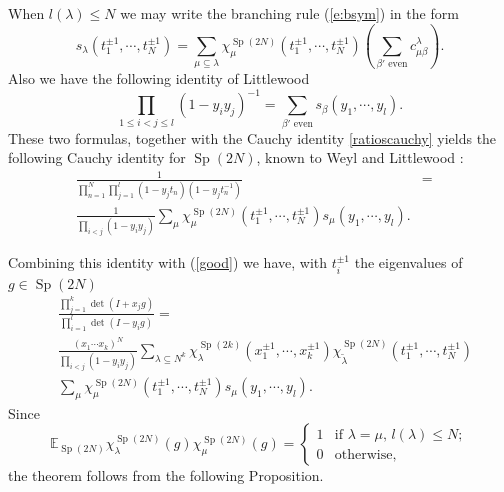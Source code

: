 \documentclass[11pt]{amsart}
\newcommand{\tmop}[1]{\ensuremath{\operatorname{#1}}}
\begin{document}
  When $l ( \lambda ) \leqslant N$ we may write the branching rule
  (\ref{e:bsym}) in the form
  \begin{equation}
    s_{\lambda} ( t_1^{\pm 1}, \cdots, t_N^{\pm 1} ) = \sum_{\mu \subseteq
    \lambda} \chi_{\mu}^{\tmop{Sp} ( 2 N )} ( t_1^{\pm 1}, \cdots, t_N^{\pm 1}
    ) \left( \sum_{\text{$\beta'$ even}} c^{\lambda}_{\mu \beta} \right) .
  \end{equation}
  Also we have the following identity of Littlewood~{\cite{Li}}
  \[ \prod_{1 \leqslant i < j \leqslant l} ( 1 - y_i y_j )^{- 1} =
     \sum_{\text{$\beta'$ even}} s_{\beta} ( y_1, \cdots, y_l ) . \]
  These two formulas, together with the Cauchy identity \eqref{ratioscauchy} yields the
  following Cauchy identity for $\tmop{Sp} ( 2 N )$, known to Weyl
  {\cite{weyl}} and Littlewood {\cite{Li}}:
  \begin{eqnarray*}
    \frac{1}{\prod_{n = 1}^N \prod_{j = 1}^l ( 1 - y_j t_n ) ( 1 - y_j t_n^{-
    1} )} & = & \\
    \frac{1}{\prod_{i < j} ( 1 - y_i y_j )} \sum_{\mu} \chi_{\mu}^{\tmop{Sp} (
    2 N )} ( t_1^{\pm 1}, \cdots, t_N^{\pm 1} ) s_{\mu} ( y_1, \cdots, y_l
    ).
    &  &
  \end{eqnarray*}


  Combining this identity with (\ref{good}) we have, with $t_i^{\pm 1}$
  the eigenvalues of $g \in \tmop{Sp} ( 2 N )$
\begin{equation*}
\begin{aligned}
&    \frac{\prod_{j = 1}^k \det ( I + x_j g )}{\prod_{i = 1}^l
\det ( I - y_i g
    )} =\\
    & \frac{( x_1 \cdots x_k )^N}{\prod_{i < j} ( 1 - y_i y_j )}
\sum_{\lambda
    \subseteq N^k} \chi_{\lambda}^{\tmop{Sp} ( 2
    k
    )} (
    x_1^{\pm 1}, \cdots, x_k^{\pm 1} ) \chi_{\tilde{\lambda}}^{\tmop{Sp} ( 2 N
    )} ( t_1^{\pm 1}, \cdots, t_N^{\pm 1} )  \\
&    \sum_{\mu} \chi_{\mu}^{\tmop{Sp} ( 2 N )} ( t_1^{\pm 1},
\cdots, t_N^{\pm
    1} ) s_{\mu} ( y_1, \cdots, y_l ).
    \end{aligned}
\end{equation*}
  Since
  \[ \mathbb{E}_{\tmop{Sp} ( 2 N )} \chi_{\lambda}^{\tmop{Sp} ( 2 N
    )} ( g )
     \chi_{\mu}^{\tmop{Sp} ( 2 N
    )} ( g ) = \left\{\begin{array}{ll}
       1 & \text{if $\lambda = \mu$, $l ( \lambda ) \leqslant N$} ;\\
       0 & \text{otherwise} ,
     \end{array}\right. \]
  the theorem follows from the following Proposition.
\end{document}
